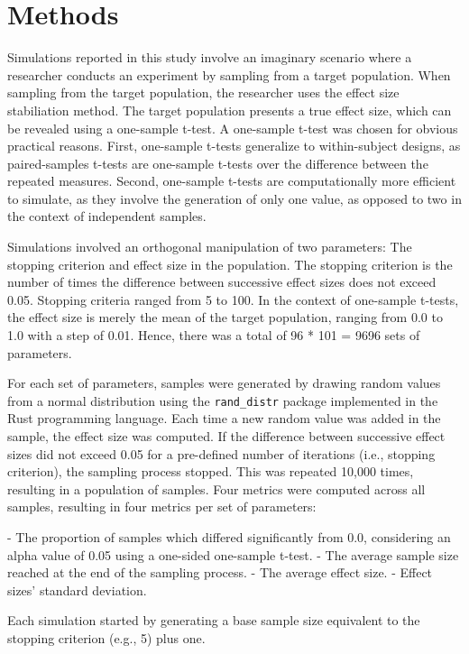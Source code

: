 \documentclass[12pt]{article}
\begin{document}
    \section{Methods}
    Simulations reported in this study involve an imaginary scenario where a researcher conducts an experiment by sampling from a target population. When sampling from the target population, the researcher uses the effect size stabiliation method. The target population presents a true effect size, which can be revealed using a one-sample t-test. A one-sample t-test was chosen for obvious practical reasons. First, one-sample t-tests generalize to within-subject designs, as paired-samples t-tests are one-sample t-tests over the difference between the repeated measures. Second, one-sample t-tests are computationally more efficient to simulate, as they involve the generation of only one value, as opposed to two in the context of independent samples.

    Simulations involved an orthogonal manipulation of two parameters: The stopping criterion and effect size in the population. The stopping criterion is the number of times the difference between successive effect sizes does not exceed 0.05. Stopping criteria ranged from 5 to 100. In the context of one-sample t-tests, the effect size is merely the mean of the target population, ranging from 0.0 to 1.0 with a step of 0.01. Hence, there was a total of 96 * 101 = 9696 sets of parameters.

    For each set of parameters, samples were generated by drawing random values from a normal distribution using the \texttt{rand\_distr} package implemented in the Rust programming language. Each time a new random value was added in the sample, the effect size was computed. If the difference between successive effect sizes did not exceed 0.05 for a pre-defined number of iterations (i.e., stopping criterion), the sampling process stopped. This was repeated 10,000 times, resulting in a population of samples. Four metrics were computed across all samples, resulting in four metrics per set of parameters:

    - The proportion of samples which differed significantly from 0.0, considering an alpha value of 0.05 using a one-sided one-sample t-test.
    - The average sample size reached at the end of the sampling process.
    - The average effect size.
    - Effect sizes' standard deviation.

    Each simulation started by generating a base sample size equivalent to the stopping criterion (e.g., 5) plus one.
\end{document}
